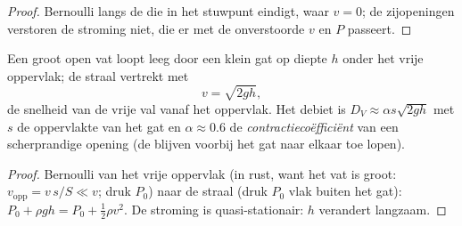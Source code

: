 \begin{proof}
Bernoulli langs de  die in het stuwpunt eindigt, waar $v = 0$; de
zijopeningen verstoren de stroming niet, die er met de onverstoorde $v$ en
$P$ passeert.
\end{proof}

\begin{proposition}\label{prop:b2:euler-bernoulli:torricelli}
Een groot open vat loopt leeg door een klein gat op diepte $h$ onder het
vrije oppervlak; de straal vertrekt met
\[
v = \sqrt{2gh} ,
\]
de snelheid van de vrije val vanaf het oppervlak. Het debiet is
$D_V \approx
\alpha s\sqrt{2gh}$ met $s$ de oppervlakte van het gat en
$\alpha \approx 0.6$ de \emph{contractiecoëfficiënt} van een scherprandige
opening (de  blijven voorbij het gat naar elkaar toe lopen).
\end{proposition}

\begin{proof}
Bernoulli van het vrije oppervlak (in rust, want het vat is groot:
$v_{\text{opp}} = v\,s/S \ll v$; druk $P_0$) naar de straal (druk $P_0$ vlak
buiten het gat): $P_0 + \rho gh = P_0 + \tfrac12\rho v^2$. De stroming is
quasi-stationair: $h$ verandert langzaam.
\end{proof}

